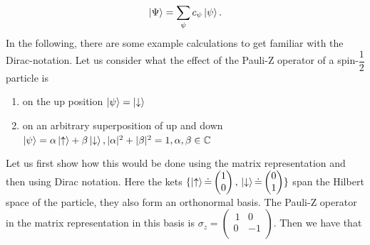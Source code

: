 \begin{equation}
\ket{\Psi} = \sum_{\psi} c_{\psi}\ket{\psi}.
\end{equation}
In the following, there are some example calculations to get familiar with the Dirac-notation. Let us consider what the effect of the Pauli-Z operator of a spin-$\dfrac{1}{2}$ particle is
\begin{enumerate}[label=\textbf{\alph*)}]
\item on the up position $\ket{\psi} = \ket{\downarrow}$

\item on an arbitrary superposition of up and down $\ket{\psi} = \alpha \ket{\uparrow} + \beta\ket{\downarrow}, |\alpha|^2 + |\beta|^2 = 1, \alpha,\beta \in \mathbb{C}$
\end{enumerate}
Let us first show how this would be done using the matrix representation and then using Dirac notation.
Here the kets $\{\ket{\uparrow} \dot{=} \begin{pmatrix}
1 \\ 0
\end{pmatrix}, \, \ket{\downarrow} \dot{=} \begin{pmatrix}
0 \\ 1
\end{pmatrix} \}$ span the Hilbert space of the particle, they also form an orthonormal basis. The Pauli-Z operator in the matrix representation in this basis is $\sigma_z = \begin{pmatrix}
\,1 & 0 \\
0 & -1 \\
\end{pmatrix}$. Then we have that 

